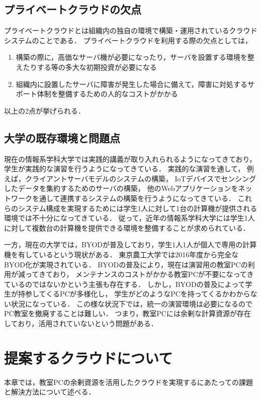 \documentclass[11pt,a4paper]{jsarticle}
\begin{document}
\subsection{プライベートクラウドの欠点}
プライベートクラウドとは組織内の独自の環境で構築・運用されているクラウドシステムのことである．
プライベートクラウドを利用する際の欠点としては，
\begin{enumerate}
	\item 構築の際に，高価なサーバ機が必要になったり，サーバを設置する環境を整えたりする等の多大な初期投資が必要になる
	\item 組織内に設置したサーバに障害が発生した場合に備えて，障害に対処するサポート体制を整備するための人的なコストがかかる
\end{enumerate}
以上の2点が挙げられる．

\subsection{大学の既存環境と問題点}
現在の情報系学科大学では実践的講義が取り入れられるようになってきており，学生が実践的な演習を行うようになってきている．
実践的な演習を通して，
例えば，クライアントサーバモデルのシステムの構築，
IoTデバイスでセンシングしたデータを集約するためのサーバの構築，
他のWebアプリケーションをネットワークを通して連携するシステムの構築を行うようになってきている．
これらのシステム構成を実現するためには学生1人に対して1台の計算機が提供される環境では不十分になってきている．
従って，近年の情報系学科大学には学生1人に対して複数台の計算機を提供できる環境を整備することが求められている．
\par 一方，現在の大学では，BYODが普及しており，学生1人1人が個人で専用の計算機を有しているという現状がある．
東京農工大学では2016年度から完全なBYOD化が実現されている\cite{nokodai}．
BYODの普及により，現在は演習用の教室PCの利用が減ってきており，
メンテナンスのコストがかかる教室PCが不要になってきているのではないかという主張も存在する．
しかし，BYODの普及によって学生が持参してくるPCが多様化し，
学生がどのようなPCを持ってくるかわからない状況になっている．
この様な状況下では，統一の演習環境は必要になるのでPC教室を撤廃することは難しい．
つまり，教室PCには余剰な計算資源が存在しており，活用されていないという問題がある．

\section{提案するクラウドについて}
本章では，教室PCの余剰資源を活用したクラウドを実現するにあたっての課題と解決方法について述べる．
\end{document}
